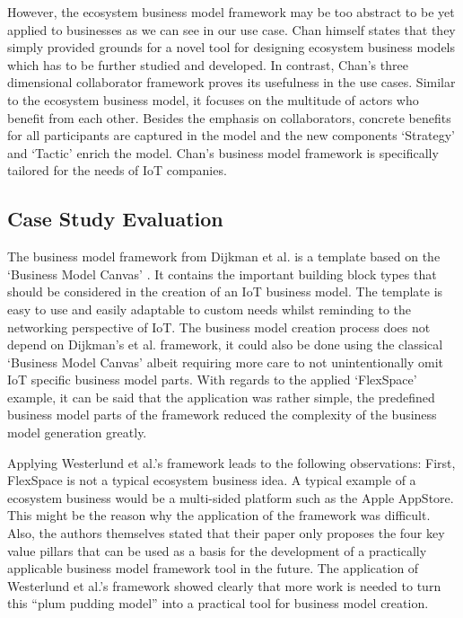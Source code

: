 		However, the ecosystem business model framework may be too abstract to be yet applied to businesses as we can see in our use case. Chan himself states that they simply provided grounds for a novel tool for designing ecosystem business models which has to be further studied and developed. In contrast, Chan's three dimensional collaborator framework proves its usefulness in the use cases. Similar to the ecosystem business model, it focuses on the multitude of actors who benefit from each other. Besides the emphasis on collaborators, concrete benefits for all participants are captured in the model and the new components `Strategy' and `Tactic' enrich the model. Chan's business model framework is specifically tailored for the needs of IoT companies.	
	
	\subsection{Case Study Evaluation}
		The business model framework from Dijkman et al. \cite{dijkman} is a template based on the `Business Model Canvas' \cite{bmc}. It contains the important building block types that should be considered in the creation of an IoT business model. The template is easy to use and easily adaptable to custom needs whilst reminding to the networking perspective of IoT. The business model creation process does not depend on Dijkman's et al. framework, it could also be done using the classical `Business Model Canvas' albeit requiring more care to not unintentionally omit IoT specific business model parts.
		With regards to the applied `FlexSpace' example, it can be said that the application was rather simple, the predefined business model parts of the framework reduced the complexity of the business model generation greatly.

		Applying Westerlund et al.'s framework leads to the following observations: First, FlexSpace is not a typical ecosystem business idea. A typical example of a ecosystem business would be a multi-sided platform such as the Apple AppStore. This might be the reason why the application of the framework was difficult. Also, the authors themselves stated that their paper only proposes the four key value pillars that can be used as a basis for the development of a practically applicable business model framework tool in the future. The application of Westerlund et al.'s framework showed clearly that more work is needed to turn this ``plum pudding model'' \cite[p.~10]{westerlund} into a practical tool for business model creation.

